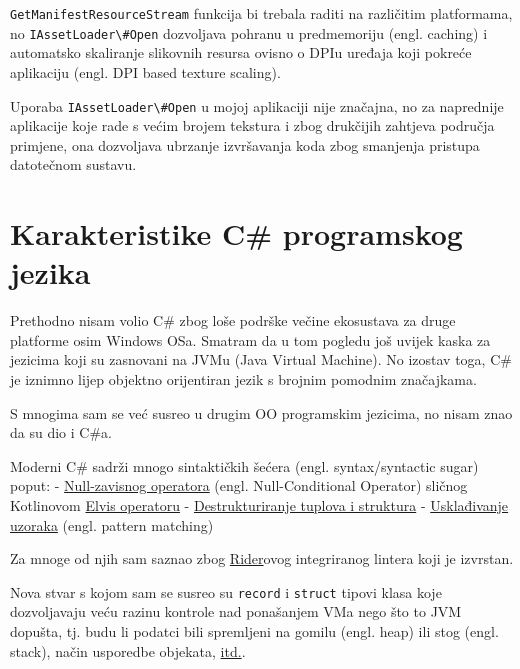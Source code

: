 \documentclass[12pt,a4paper]{report}
\begin{document}
\verb|GetManifestResourceStream| funkcija bi trebala raditi na
različitim platformama, no \verb|IAssetLoader\#Open| dozvoljava
pohranu u predmemoriju (engl. caching) i automatsko skaliranje slikovnih
resursa ovisno o DPIu uređaja koji pokreće aplikaciju (engl. DPI based
texture scaling).

Uporaba \verb|IAssetLoader\#Open| u mojoj aplikaciji nije značajna, no
za naprednije aplikacije koje rade s većim brojem tekstura i zbog
drukčijih zahtjeva područja primjene, ona dozvoljava ubrzanje
izvršavanja koda zbog smanjenja pristupa datotečnom sustavu.

\hypertarget{karakteristike-c-programskog-jezika}{%
\chapter{Karakteristike C\# programskog
jezika}\label{karakteristike-c-programskog-jezika}}

Prethodno nisam volio C\# zbog loše podrške večine ekosustava za druge
platforme osim Windows OSa. Smatram da u tom pogledu još uvijek kaska za
jezicima koji su zasnovani na JVMu (Java Virtual Machine). No izostav
toga, C\# je iznimno lijep objektno orijentiran jezik s brojnim pomodnim
značajkama.

S mnogima sam se već susreo u drugim OO programskim jezicima, no nisam
znao da su dio i C\#a.

Moderni C\# sadrži mnogo sintaktičkih šećera (engl. syntax/syntactic
sugar) poput: -
\href{https://csharp.christiannagel.com/2016/06/17/nullconditionaloperator/}{Null-zavisnog
operatora} (engl. Null-Conditional Operator) sličnog Kotlinovom
\href{https://kotlin-quick-reference.com/156-R-elvis-operator.html}{Elvis
operatoru} -
\href{https://learn.microsoft.com/en-us/dotnet/csharp/fundamentals/functional/deconstruct}{Destrukturiranje
tuplova i struktura} -
\href{https://learn.microsoft.com/en-us/dotnet/csharp/fundamentals/functional/pattern-matching}{Usklađivanje
uzoraka} (engl. pattern matching)

Za mnoge od njih sam saznao zbog
\href{https://www.jetbrains.com/rider/}{Rider}ovog integriranog lintera
koji je izvrstan.

Nova stvar s kojom sam se susreo su \verb|record| i \verb|struct|
tipovi klasa koje dozvoljavaju veću razinu kontrole nad ponašanjem VMa
nego što to JVM dopušta, tj. budu li podatci bili spremljeni na gomilu
(engl. heap) ili stog (engl. stack), način usporedbe objekata,
\href{https://stackoverflow.com/questions/64816714/when-to-use-record-vs-class-vs-struct}{itd.}.
\end{document}
